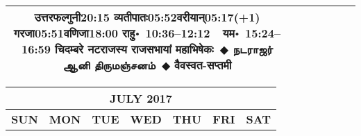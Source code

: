 \documentclass[a3paper,12pt,landscape]{article}
\newcommand{\eventsep}{~$\Diamondblack$ }
\newcommand{\To}{\hspace{1pt}\raisebox{0pt}{\tiny\RIGHTarrow}\hspace{1pt}}
\newcommand{\tamil}[1]{%
{\fontspec[Scale=0.9,FakeStretch=0.9]{Noto Sans Tamil} \footnotesize #1}}
\newcommand{\rahuyama}[2]{%
{राहु॰~\textsf{#1}~~यम॰~\textsf{#2}}
}
\begin{document}
\begin{center}
\begin{tabular}{|c|c|c|c|c|c|c|}
{{\mbox{उत्तरफल्गुनी\To{}\textsf{20:15\hspace{2ex}}}}%
{\mbox{व्यतीपातः\To{}\textsf{05:52\hspace{2ex}}}\mbox{वरीयान्\To{}\textsf{05:17(+1)\hspace{2ex}}}}%
{\mbox{गरजा\To{}\textsf{05:51\hspace{2ex}}}\mbox{वणिजा\To{}\textsf{18:00\hspace{2ex}}}}}%
{\rahuyama{10:36--12:12}{15:24--16:59}}%
{चिदम्बरे नटराजस्य राजसभायां महाभिषेकः\eventsep \tamil{நடராஜர் ஆனி திருமஞ்சனம்}\eventsep वैवस्वत-सप्तमी}
&
\\ \hline
\end{tabular}



\begin{tabular}{|c|c|c|c|c|c|c|}
\multicolumn{7}{c}{\Large \bfseries \sffamily JULY 2017}\\[3mm]
\hline
\textbf{\textsf{SUN}} & \textbf{\textsf{MON}} & \textbf{\textsf{TUE}} & \textbf{\textsf{WED}} & \textbf{\textsf{THU}} & \textbf{\textsf{FRI}} & \textbf{\textsf{SAT}} \\ \hline


\end{tabular}
\end{center}
\end{document}
